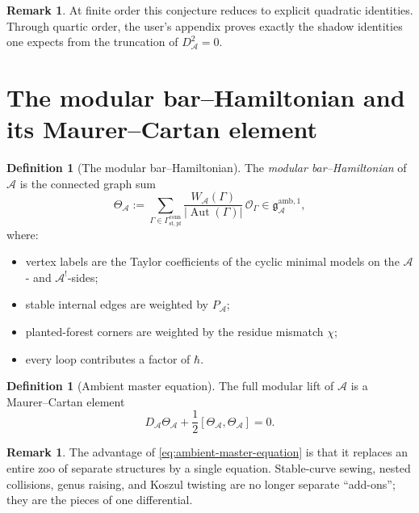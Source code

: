 \documentclass[11pt,oneside]{memoir}
\numberwithin{equation}{chapter}
\theoremstyle{definition}
\newtheorem{definition}[theorem]{Definition}
\newtheorem{remark}[theorem]{Remark}
\newcommand{\cA}{\mathcal A}
\newcommand{\fg}{\mathfrak g}
\newcommand{\h}{\hbar}
\newcommand{\Aut}{\operatorname{Aut}}
\begin{document}
\begin{remark}
At finite order this conjecture reduces to explicit quadratic identities.  Through quartic order, the user's appendix proves exactly the shadow identities one expects from the truncation of \(D_{\cA}^2=0\).
\end{remark}

\section{The modular bar--Hamiltonian and its Maurer--Cartan element}

\begin{definition}[The modular bar--Hamiltonian]
\label{def:modular-bar-hamiltonian}
The \emph{modular bar--Hamiltonian} of \(\cA\) is the connected graph sum
\begin{equation}
\label{eq:modular-bar-hamiltonian}
\Theta_{\cA}
:=
\sum_{\Gamma\in \Gamma^{\mathrm{conn}}_{\mathrm{st,pf}}}
\frac{W_{\cA}(\Gamma)}{|\Aut(\Gamma)|}\,\mathcal O_{\Gamma}
\in \fg^{\mathrm{amb},1}_{\cA},
\end{equation}
where:
\begin{itemize}[leftmargin=2.4em]
\item vertex labels are the Taylor coefficients of the cyclic minimal models on the \(\cA\)- and \(\cA^!\)-sides;
\item stable internal edges are weighted by \(P_{\cA}\);
\item planted-forest corners are weighted by the residue mismatch \(\chi\);
\item every loop contributes a factor of \(\h\).
\end{itemize}
\end{definition}

\begin{definition}[Ambient master equation]
\label{def:ambient-master-equation}
The full modular lift of \(\cA\) is a Maurer--Cartan element
\begin{equation}
\label{eq:ambient-master-equation}
D_{\cA}\Theta_{\cA}+\frac12[\Theta_{\cA},\Theta_{\cA}]=0.
\end{equation}
\end{definition}

\begin{remark}
The advantage of \eqref{eq:ambient-master-equation} is that it replaces an entire zoo of separate structures by a single equation.  Stable-curve sewing, nested collisions, genus raising, and Koszul twisting are no longer separate ``add-ons''; they are the pieces of one differential.
\end{remark}
\end{document}
